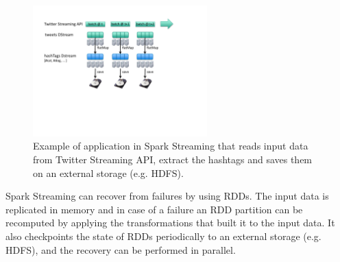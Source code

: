 \documentclass[ppgc,diss,english]{iiufrgs}
\begin{document}
\begin{figure}[!ht]
	\centering
	\includegraphics[width=0.6\textwidth]{images/spark/example.pdf}
	\caption[Example of application in Spark Streaming]{Example of application in Spark Streaming that reads input data from Twitter Streaming API, extract the hashtags and saves them on an external storage (e.g. HDFS).}
	\label{fig:s4_structure}
\end{figure}

Spark Streaming can recover from failures by using RDDs. The input data is replicated in memory and in case of a failure an RDD partition can be recomputed by applying the transformations that built it to the input data. It also checkpoints the state of RDDs periodically to an external storage (e.g. HDFS), and the recovery can be performed in parallel.
\end{document}
